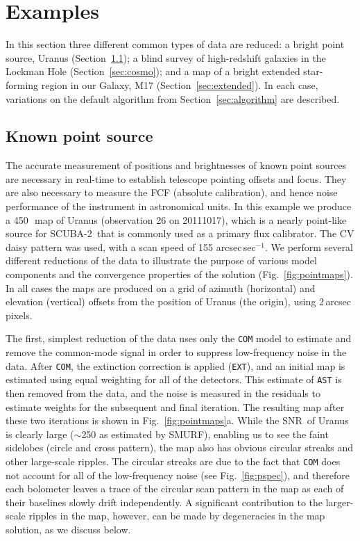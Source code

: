 \documentclass[useAMS,usenatbib,nofootinbib]{mn2e}
\newcommand{\snr}{SNR}
\newcommand{\scuba}{SCUBA-2}
\newcommand{\model}[1]{\texttt{#1}}
\begin{document}
\section{Examples}
\label{sec:examples}

In this section three different common types of data are reduced: a
bright point source, Uranus (Section~\ref{sec:point}); a blind survey
of high-redshift galaxies in the Lockman Hole
(Section~\ref{sec:cosmo}); and a map of a bright extended star-forming
region in our Galaxy, M17 (Section~\ref{sec:extended}). In each case,
variations on the default algorithm from Section~\ref{sec:algorithm}
are described.

\subsection{Known point source}
\label{sec:point}

The accurate measurement of positions and brightnesses of known point
sources are necessary in real-time to establish telescope pointing
offsets and focus. They are also necessary to measure the FCF
(absolute calibration), and hence noise performance of the instrument
in astronomical units.  In this example we produce a 450\,\micron\ map
of Uranus (observation 26 on 20111017), which is a nearly point-like
source for \scuba\ that is commonly used as a primary flux
calibrator. The CV daisy pattern was used, with a scan speed of 155
arcsec\,sec$^{-1}$. We perform several different reductions of the
data to illustrate the purpose of various model components and the
convergence properties of the solution (Fig.~\ref{fig:pointmaps}). In
all cases the maps are produced on a grid of azimuth (horizontal) and
elevation (vertical) offsets from the position of Uranus (the origin),
using 2\,arcsec pixels.

The first, simplest reduction of the data uses only the \model{COM}
model to estimate and remove the common-mode signal in order to
suppress low-frequency noise in the data. After \model{COM}, the
extinction correction is applied (\model{EXT}), and an initial map is
estimated using equal weighting for all of the detectors. This
estimate of \model{AST} is then removed from the data, and the noise
is measured in the residuals to estimate weights for the subsequent
and final iteration. The resulting map after these two iterations is
shown in Fig.~\ref{fig:pointmaps}a. While the \snr\ of Uranus is clearly
large ($\sim$250 as estimated by SMURF), enabling us to see the faint
sidelobes (circle and cross pattern), the map also has obvious
circular streaks and other large-scale ripples. The circular streaks
are due to the fact that \model{COM} does not account for all of the
low-frequency noise (see Fig.~\ref{fig:pspec}), and therefore each
bolometer leaves a trace of the circular scan pattern in the map as
each of their baselines slowly drift independently. A significant
contribution to the larger-scale ripples in the map, however, can be
made by degeneracies in the map solution, as we discuss below.
\end{document}
